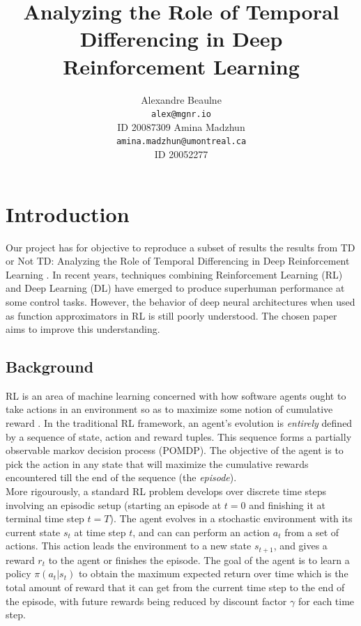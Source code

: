 \documentclass{article}
\title{Analyzing the Role of Temporal Differencing in Deep Reinforcement Learning}
\author{
  Alexandre Beaulne \\
  \texttt{alex@mgnr.io} \\
  ID 20087309
  \And
  Amina Madzhun \\
  \texttt{amina.madzhun@umontreal.ca} \\
  ID 20052277
}
\begin{document}
\maketitle
\section{Introduction}

Our project has for objective to reproduce a subset of results
the results from TD or Not TD: Analyzing the Role of Temporal
Differencing in Deep Reinforcement Learning \citep{amiranashvili2018analyzing}.
In recent years, techniques combining Reinforcement Learning (RL)
and Deep Learning (DL) have emerged \citep{mnih2015} to produce
superhuman performance at some control tasks. However, the behavior
of deep neural architectures when used as function approximators
in RL is still poorly understood. The chosen paper aims to improve
this understanding.

\subsection*{Background}

RL is an area of machine learning concerned with how software agents
ought to take actions in an environment so as to maximize some notion
of cumulative reward \citep{suttonbarto2018}. In the traditional RL
framework, an agent's evolution is \emph{entirely} defined by a sequence
of state, action and reward tuples. This sequence forms a
partially observable markov decision process (POMDP). The objective
of the agent is to pick the action in any state that will
maximize the cumulative rewards encountered till the end of the
sequence (the \emph{episode}).\\

More rigourously, a standard RL problem develops over discrete
time steps involving an episodic setup (starting an episode at
$t=0$ and finishing it at terminal time step $t=T$).
The agent evolves in a stochastic environment with its current state
$s_t$ at time step $t$, and can can perform an action $a_t$ from a
set of actions. This action leads the environment to a new state
$s_{t + 1}$, and gives a reward $r_t$ to the agent or finishes the episode.
The goal of the agent is to learn a policy $\pi(a_t|s_t)$
to obtain the maximum expected return over time which is
the total amount of reward that it can get from the current time step
to the end of the episode, with future rewards being reduced by discount
factor $\gamma$ for each time step. \\
\end{document}
